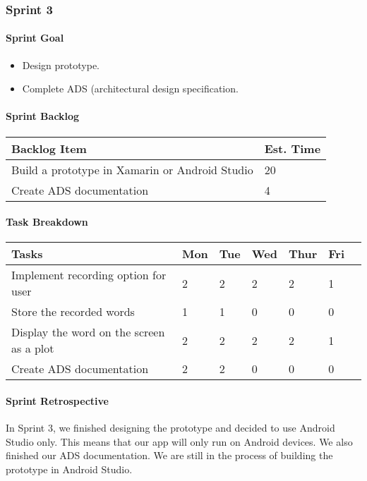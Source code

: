 \subsubsection{Sprint 3}

\paragraph{Sprint Goal}
\begin{itemize}
    \item  Design prototype.
    \item  Complete ADS (architectural design specification.
\end{itemize}

\paragraph{Sprint Backlog}
\begin{table}[htbp]
    \centering
    \begin{tabularx}{\textwidth}{l|l}
        Backlog Item & Est. Time\\
        \hline
        Build a prototype in Xamarin or Android Studio & 20\\
        Create ADS documentation & 4\\
    \end{tabularx}
\end{table}

\paragraph{Task Breakdown}
\begin{tabular}[htbp]
    \centering
    \begin{tabularx}{\textwidth}{l|l|l|l|l|l|l}
        Tasks &    Mon & Tue & Wed & Thur & Fri\\
        \hline
        Implement recording option for user & 2 & 2 & 2 & 2 & 1\\
        Store the recorded words & 1 & 1 & 0 & 0 & 0\\
        Display the word on the screen as a plot & 2 & 2 & 2 & 2 & 1\\
        Create ADS documentation & 2 & 2 & 0 & 0 & 0\\
    \end{tabularx}
\end{tabular}

\paragraph{Sprint Retrospective}
In Sprint 3, we finished designing the prototype and decided to use Android Studio only. This means that our app will only run on Android devices. We also finished our ADS documentation. We are still in the process of building the prototype in Android Studio.
